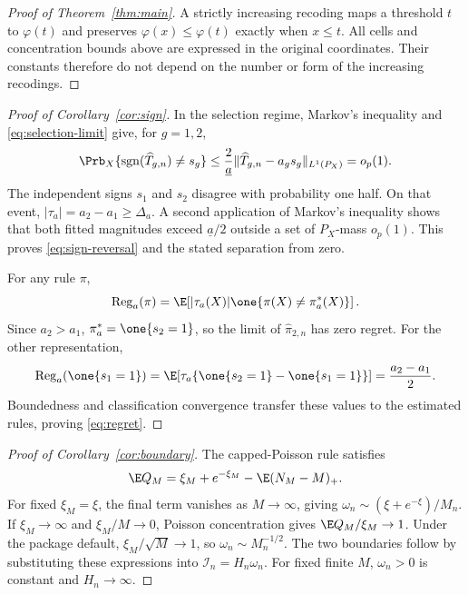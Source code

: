 \begin{appendix}
\begin{proof}[Proof of Theorem~\ref{thm:main}]
A strictly increasing recoding maps a threshold \(t\) to \(\varphi(t)\)
and preserves \(\varphi(x)\le\varphi(t)\) exactly when \(x\le t\).
All cells and concentration bounds above are expressed in the original
coordinates. Their constants therefore do not depend on the number or
form of the increasing recodings.
\end{proof}

\begin{proof}[Proof of Corollary~\ref{cor:sign}]
In the selection regime, Markov's inequality and
\eqref{eq:selection-limit} give, for \(g=1,2\),
\[
\Prb_X\{\operatorname{sgn}(\widehat T_{g,n})\ne s_g\}
\le\frac{2}{\underline a}
\|\widehat T_{g,n}-a_gs_g\|_{L^1(P_X)}=o_p(1).
\]
The independent signs \(s_1\) and \(s_2\) disagree with probability one half.
On that event, \(|\tau_a|=a_2-a_1\ge\Delta_a\). A second application of
Markov's inequality shows that both fitted magnitudes exceed
\(\underline a/2\) outside a set of \(P_X\)-mass \(o_p(1)\). This proves
\eqref{eq:sign-reversal} and the stated separation from zero.

For any rule \(\pi\),
\[
\operatorname{Reg}_a(\pi)
=\E\!\left[|\tau_a(X)|
\one\{\pi(X)\ne\pi_a^*(X)\}\right].
\]
Since \(a_2>a_1\), \(\pi_a^*=\one\{s_2=1\}\), so the limit of
\(\widehat\pi_{2,n}\) has zero regret. For the other representation,
\[
\operatorname{Reg}_a(\one\{s_1=1\})
=\E\!\left[\tau_a
\{\one\{s_2=1\}-\one\{s_1=1\}\}\right]
=\frac{a_2-a_1}{2}.
\]
Boundedness and classification convergence transfer these values to the
estimated rules, proving \eqref{eq:regret}.
\end{proof}

\begin{proof}[Proof of Corollary~\ref{cor:boundary}]
The capped-Poisson rule satisfies
\[
\E Q_M=\xi_M+e^{-\xi_M}-\E(N_M-M)_+.
\]
For fixed \(\xi_M=\xi\), the final term vanishes as \(M\to\infty\), giving
\(\omega_n\sim(\xi+e^{-\xi})/M_n\). If \(\xi_M\to\infty\) and
\(\xi_M/M\to0\), Poisson concentration gives
\(\E Q_M/\xi_M\to1\). Under the package default,
\(\xi_M/\sqrt M\to1\), so \(\omega_n\sim M_n^{-1/2}\). The two boundaries
follow by substituting these expressions into
\(\mathcal I_n=H_n\omega_n\). For fixed finite \(M\), \(\omega_n>0\) is
constant and \(H_n\to\infty\).
\end{proof}


\end{appendix}
